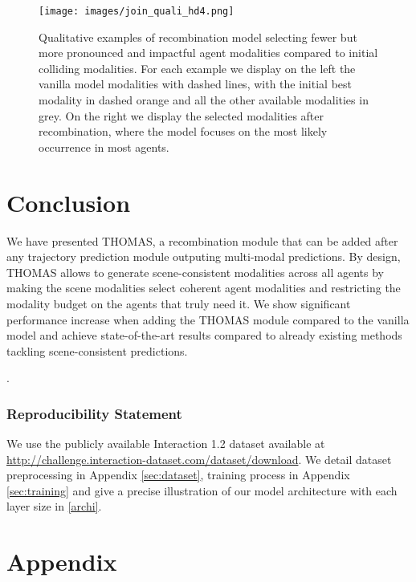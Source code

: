 \documentclass{article} \usepackage{iclr2022_conference,times}
\begin{document}
\begin{figure}[t]
\centerline{\texttt{[image: images/join\_quali\_hd4.png]}}
\caption{Qualitative examples of recombination model selecting fewer but more pronounced and impactful agent modalities compared to initial colliding modalities. For each example we display on the left the vanilla model modalities with dashed lines, with the initial best modality in dashed orange and all the other available modalities in grey. On the right we display the selected modalities after recombination, where the model focuses on the most likely occurrence in most agents.}
\label{fig:joint_quali}
\end{figure}





\section{Conclusion}

We have presented THOMAS, a recombination module that can be added after any trajectory prediction module outputing multi-modal predictions. By design, THOMAS allows to generate scene-consistent modalities across all agents by making the scene modalities select coherent agent modalities and restricting the modality budget on the agents that truly need it. We show significant performance increase when adding the THOMAS module compared to the vanilla model and achieve state-of-the-art results compared to already existing methods tackling scene-consistent predictions. 

.\clearpage

\subsubsection*{Reproducibility Statement}

We use the publicly available Interaction 1.2 dataset \citep{zhan2019interaction} available at \url{http://challenge.interaction-dataset.com/dataset/download}. We detail dataset preprocessing in Appendix \ref{sec:dataset}, training process in Appendix \ref{sec:training} and give a precise illustration of our model architecture with each layer size in \ref{archi}.






\clearpage

\appendix
\section{Appendix}
\end{document}
